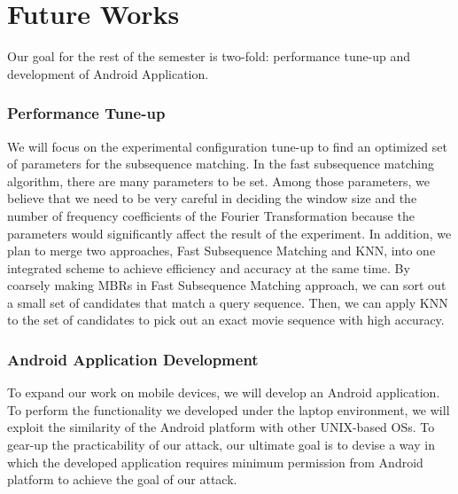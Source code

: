 \section{Future Works}
\label{sec:future}
Our goal for the rest of the semester is two-fold: performance tune-up and development of Android Application.
\subsubsection{Performance Tune-up}
We will focus on the experimental configuration tune-up to find an optimized set of parameters for the subsequence matching. In the fast subsequence matching algorithm, there are many parameters to be set. Among those parameters, we believe that we need to be very careful in deciding the window size and the number of frequency coefficients of the Fourier Transformation because the parameters would significantly affect the result of the experiment.
In addition, we plan to merge two approaches, Fast Subsequence Matching and KNN, into one integrated scheme to achieve efficiency and accuracy at the same time. By coarsely making MBRs in Fast Subsequence Matching approach, we can sort out a small set of candidates that match a query sequence. Then, we can apply KNN to the set of candidates to pick out an exact movie sequence with high accuracy.
\subsubsection{Android Application Development}
To expand our work on mobile devices, we will develop an Android application. To perform the functionality we developed under the laptop environment, we will exploit the similarity of the Android platform with other UNIX-based OSs. To gear-up the practicability of our attack, our ultimate goal is to devise a way in which the developed application requires minimum permission from Android platform to achieve the goal of our attack.